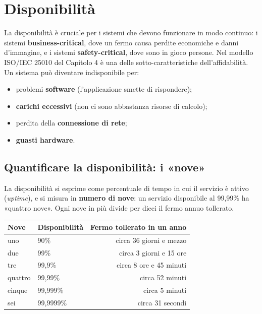 \section{Disponibilità}


La disponibilità è cruciale per i sistemi che devono funzionare in modo continuo: i sistemi \textbf{business-critical},
dove un fermo causa perdite economiche e danni d'immagine, e i sistemi \textbf{safety-critical}, dove sono in gioco persone.
Nel modello ISO/IEC 25010 del Capitolo 4 è una delle sotto-caratteristiche dell'affidabilità. Un sistema può diventare
indisponibile per:
\begin{itemize}
  \item problemi \textbf{software} (l'applicazione smette di rispondere);
  \item \textbf{carichi eccessivi} (non ci sono abbastanza risorse di calcolo);
  \item perdita della \textbf{connessione di rete};
  \item \textbf{guasti hardware}.
\end{itemize}

\subsection{Quantificare la disponibilità: i «nove»}

La disponibilità si esprime come percentuale di tempo in cui il servizio è attivo (\textit{uptime}), e si misura in
\textbf{numero di nove}: un servizio disponibile al 99{,}99\% ha «quattro nove». Ogni nove in più divide per dieci il fermo
annuo tollerato.

\begin{center}
\renewcommand{\arraystretch}{1.3}
\begin{tabular}{@{}llr@{}}
  \toprule
  \textbf{Nove} & \textbf{Disponibilità} & \textbf{Fermo tollerato in un anno} \\
  \midrule
  uno     & 90\%        & circa 36 giorni e mezzo \\
  due     & 99\%        & circa 3 giorni e 15 ore \\
  tre     & 99{,}9\%    & circa 8 ore e 45 minuti \\
  quattro & 99{,}99\%   & circa 52 minuti \\
  cinque  & 99{,}999\%  & circa 5 minuti \\
  sei     & 99{,}9999\% & circa 31 secondi \\
  \bottomrule
\end{tabular}
\end{center}

